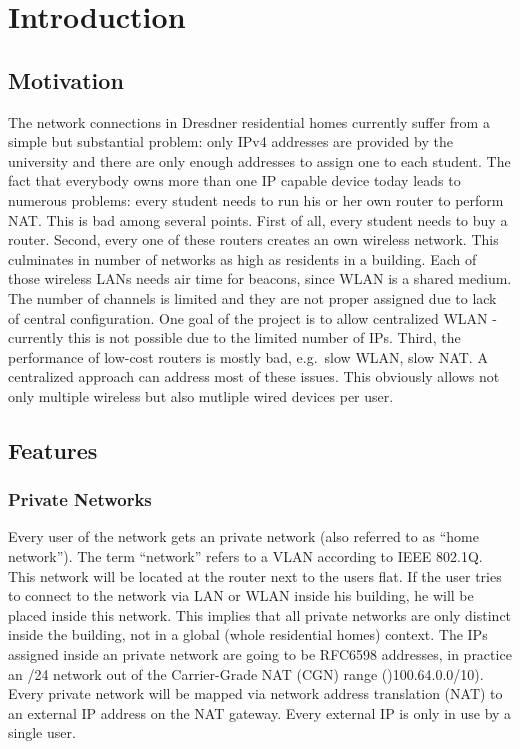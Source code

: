 \documentclass{report}
\begin{document}
\chapter{Introduction}\label{introduction}

\section{Motivation}\label{motivation}

The network connections in Dresdner residential homes currently suffer
from a simple but substantial problem: only IPv4 addresses are provided
by the university and there are only enough addresses to assign one to
each student. The fact that everybody owns more than one IP capable device
today leads to numerous problems: every student needs to run his or her own
router to perform NAT. This is bad among several points. First of all, every student needs to buy a router. Second,
every one of these routers creates an own wireless network. This culminates in
number of networks as high as residents in a building. Each of those
wireless LANs needs air time for beacons, since WLAN is a shared
medium\cite{FastWiFi}. The number of channels is limited and they are not proper
assigned due to lack of central configuration. One goal of
the project is to allow centralized WLAN - currently this is not possible due
to the limited number of IPs. Third, the performance of low-cost routers is
mostly bad, e.g.~slow WLAN, slow NAT. A centralized approach can address most of these
issues. This obviously allows not only multiple wireless but also mutliple wired devices per user.


\section{Features}\label{features}

\subsection{Private Networks}\label{private-networks}

Every user of the network gets an private network (also
referred to as ``home network''). The term ``network'' refers to a VLAN
according to IEEE 802.1Q\cite{802.1Q}. This network will be located at the router
next to the users flat. If the user tries to connect to the network via
LAN or WLAN inside his building, he will be placed inside this network. This
implies that all private networks are only distinct inside the building,
not in a global (whole residential homes) context. The IPs assigned inside an private network are
going to be RFC6598 addresses\cite{CGN}, in practice an /24 network out of the
Carrier-Grade NAT (CGN) range ()100.64.0.0/10). Every private network
will be mapped via network address translation (NAT\cite{NAT}) to an external IP
address on the NAT gateway. Every external IP is only in use by a single user.
\end{document}
